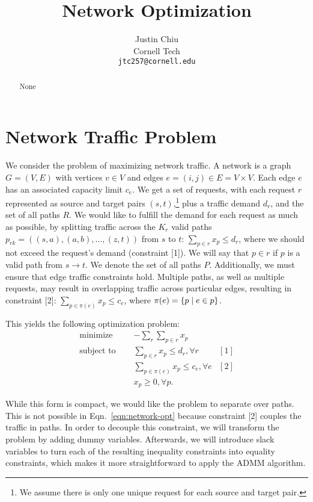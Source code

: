 \documentclass[11pt]{article}
\title{Network Optimization}
\author{Justin Chiu \\
  Cornell Tech \\
  \texttt{jtc257@cornell.edu}}
\begin{document}
\maketitle
\begin{abstract}
None
\end{abstract}

\section{Network Traffic Problem}
We consider the problem of maximizing network traffic.
A network is a graph $G = (V,E)$ with vertices $v\in V$ and edges
$e = (i,j)\in E = V\times V$.
Each edge $e$ has an associated capacity limit $c_e$.
We get a set of requests,
with each request $r$ represented as source and target pairs $(s,t)$,\footnote{
We assume there is only one unique request for each source and target pair.
}
plus a traffic demand $d_r$,
and the set of all paths $R$.
We would like to fulfill the demand for each request as much as possible,
by splitting traffic across the $K_r$ valid paths
$p_{rk} = ((s,a), (a,b), \ldots, (z,t))$ from $s$ to $t$:
$\sum_{p\in r} x_p \le d_r$, where we should not exceed the request's demand
(constraint [1]).
We will say that $p\in r$ if $p$ is a valid path from $s\to t$.
We denote the set of all paths $P$.
Additionally, we must ensure that edge traffic constraints hold.
Multiple paths, as well as multiple requests, may result in overlapping traffic
across particular edges, resulting in constraint [2]:
$\sum_{p\in\pi(e)} x_{p} \le c_e$,
where $\pi(e) = \left\{p \mid e \in p\right\}$.

This yields the following optimization problem:
\begin{equation}
\label{eqn:network-opt}
\begin{aligned}
\textrm{minimize } \quad & -\sum_r \sum_{p\in r} x_p\\
\textrm{subject to } \quad
&\sum_{p \in r}x_p \le d_r, \forall r & [1]\\
&\sum_{p\in\pi(e)} x_p \le c_e, \forall e & [2]\\
& x_p \geq 0, \forall p.
\end{aligned}
\end{equation}

While this form is compact, we would like the problem to
separate over paths. This is not possible in Eqn.~\ref{eqn:network-opt}
because constraint [2] couples the traffic in paths.
In order to decouple this constraint, we will transform the problem by adding dummy variables.
Afterwards, we will introduce slack variables to turn each of the resulting inequality constraints
into equality constraints, which makes it more straightforward to apply the ADMM algorithm.
\end{document}
